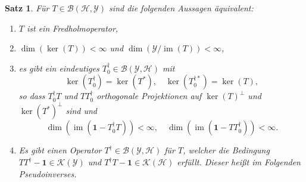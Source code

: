 \documentclass[11pt, hidelinks]{article}
\newcommand{\h}{\mathcal{H}}
\newcommand{\im}{\operatorname{im}}
\numberwithin{conj}{section}
\newtheorem{theorem}[conj]{Satz}
\begin{document}
\begin{theorem}
    \label{fredholm}
    Für $T \in \mathcal{B}(\h,\mathcal{Y})$ sind die folgenden Aussagen äquivalent:
    \begin{enumerate}
        \item $T$ ist ein Fredholmoperator,
        \item $ \dim(\ker(T)) < \infty$ und $\dim(\mathcal{Y} / \im(T)) < \infty$,
        \item es gibt ein eindeutiges $T^\dagger_0 \in \mathcal{B}(\mathcal{Y},\h)$ mit
        \begin{equation}
            \ker(T^\dagger_0) = \ker(T^\ast), \quad \ker(T^{\dagger\ast}_0) = \ker(T),
        \end{equation}
        so dass $T^\dagger_0T$ und $TT^\dagger_0$ orthogonale Projektionen auf $\ker(T)^\perp$ und $\ker(T^\ast)^\perp$ sind und
        \begin{equation}
            \dim(\im(\mathbf{1}-T^\dagger_0T)) < \infty, \quad \dim(\im(\mathbf{1}-TT^\dagger_0)) < \infty.
        \end{equation}
        \item Es gibt einen Operator $T^\dagger\in \mathcal{B}(\mathcal{Y},\h)$ für $T$, welcher die Bedingung $TT^\dagger-\mathbf{1} \in \mathcal{K}(\mathcal{Y})$ und $T^\dagger T-\mathbf{1} \in \mathcal{K}(\h)$ erfüllt. Dieser heißt im Folgenden Pseudoinverses.
    \end{enumerate}
\end{theorem}
\end{document}
